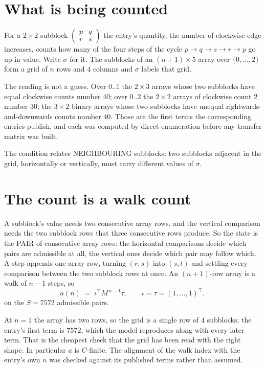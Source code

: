 \documentclass[11pt,a4paper]{article}
\theoremstyle{plain}
\theoremstyle{definition}
\begin{document}
\section{What is being counted}

For a $2\times2$ subblock $\begin{pmatrix}p&q\\r&s\end{pmatrix}$ the
entry's quantity, the number of clockwise edge increases, counts how many of the four steps of the cycle $p\to q\to s\to r\to p$ go up in value. Write $\sigma$ for it. The subblocks of an
$(n+1)\times5$ array over $\{0,\dots,2\}$ form a grid of $n$ rows and $4$
columns and $\sigma$ labels that grid.

The reading is not a guess. Over $0..1$ the $2\times3$ arrays whose two subblocks have equal
clockwise counts number $40$; over $0..2$ the $2\times2$ arrays of clockwise count $2$ number
$30$; the $3\times2$ binary arrays whose two subblocks have unequal rightwards-and-downwards
counts number $40$. Those are the first terms the corresponding entries publish, and each was
computed by direct enumeration before any transfer matrix was built.

The condition relates NEIGHBOURING subblocks: two subblocks adjacent in the grid, horizontally
or vertically, must carry different values of $\sigma$.

\section{The count is a walk count}

A subblock's value needs two consecutive array rows, and the vertical
comparison needs the two subblock rows that three consecutive rows produce. So the state is the
PAIR of consecutive array rows: the horizontal comparisons decide which pairs are admissible at
all, the vertical ones decide which pair may follow which. A step appends one array row,
turning $(r,s)$ into $(s,t)$ and settling every comparison between the two subblock rows at
once. An $(n+1)$-row array is a walk of $n-1$ steps, so
\[
a(n)\;=\;\iota^{\!\top}M^{\,n-1}\tau,\qquad\iota=\tau=(1,\dots,1)^{\!\top},
\]
on the $S=7572$ admissible pairs.

At $n=1$ the array has two rows, so the grid is a single row of $4$
subblocks; the entry's first term is $7572$, which the model
reproduces along with every later term. That is the cheapest check that the grid has been read
with the right shape.
In particular $a$ is $C$-finite. The alignment of the walk index with the entry's own $n$ was
checked against its published terms rather than assumed.
\end{document}
